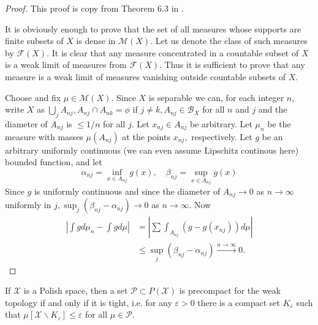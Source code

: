 \begin{proof}
	This proof is copy from Theorem 6.3 in \cite{parthasarathy2005probability}.

	It is obviously enough to prove that the set of all measures whose supports are finite subsets of \( X \) is dense in \( \mathscr { M } ( X ) . \) Let us denote the class of such measures by \( \mathscr { F } ( X ) . \) It is clear that any measure concentrated in a countable subset of \( X \) is a weak limit of measures from \( \mathscr { F } ( X ) . \) Thus it is sufficient to prove that any measure is a weak limit of measures vanishing outside countable subsets of \( X \).

	Choose and fix \( \mu \in \mathscr { M } ( X ) \). Since \( X \) is separable we can, for each integer \( n , \) write \( X \) as \( \bigcup _ { j } A _ { n j } , A _ { n j } \cap A _ { n k } = \phi \) if \( j \neq k , A _ { n j } \in \mathscr { B } _ { X } \) for all \( n \) and \( j \) and the diameter of \( A _ { n j } \) is \( \leq 1 / n \) for all \( j \). Let \( x _ { n j } \in A _ { n j } \) be arbitrary. Let \( \mu _ { n } \) be the measure with masses \( \mu \left( A _ { n j } \right) \) at the points \( x _ { n j } , \) respectively. Let $g$ be an arbitrary uniformly continuous (we can even assume Lipschitz continous here) bounded function, and let \[ \alpha _ { n j } = \inf _ { x \in A _ { n j } } g ( x ) , \quad \beta _ { n j } = \sup _ { x \in A _ { n j } } g ( x ) \]
	Since \( g \) is uniformly continuous and since the diameter of \( A _ { n j } \rightarrow 0 \) as \( n \rightarrow \infty \) uniformly in \( j , \sup _ { j } \left( \beta _ { n j } - \alpha _ { n j } \right) \rightarrow 0 \) as \( n \rightarrow \infty \). Now
	\begin{align*}
		\left| \int g d \mu _ { n } - \int g d \mu \right| & = \left| \sum \int _ { A _ { n j } } \left( g - g \left( x _ { n j } \right) \right) d \mu \right|     \\
		                                                   & \leq \sup_{j} \left( \beta _ { n j } - \alpha _ { n j } \right) \xrightarrow{ n \rightarrow \infty} 0.
	\end{align*}
\end{proof}

\begin{thm}
	If \( \mathcal { X } \) is a Polish space, then a set \( \mathcal { P } \subset P ( \mathcal { X } ) \) is precompact for the weak topology if and only if it is tight, i.e. for any \( \varepsilon > 0 \) there is a compact set \( K _ { \varepsilon } \) such that \( \mu \left[ \mathcal { X } \backslash K _ { \varepsilon } \right] \leq \varepsilon \) for all \( \mu \in \mathcal { P } \).
\end{thm}

